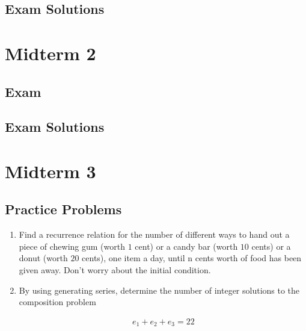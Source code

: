 \documentclass{report}
\begin{document}
{\subsection*{Exam Solutions}

\section{Midterm 2}

\subsection*{Exam}

\subsection*{Exam Solutions}

\section*{Midterm 3}

\subsection*{Practice Problems}

\begin{enumerate}
    \item Find a recurrence relation for the number of different ways to hand
          out a piece of chewing gum (worth $1$ cent) or a candy bar (worth $10$
          cents) or a donut (worth $20$ cents), one item a day, until n cents worth
          of food has been given away. Don’t worry about the initial condition.

    \item  By using generating series, determine the number of integer solutions
          to the composition problem

          \begin{align*}
              e_1 + e_2 + e_3 = 22
          \end{align*}


\end{enumerate}}
\end{document}
